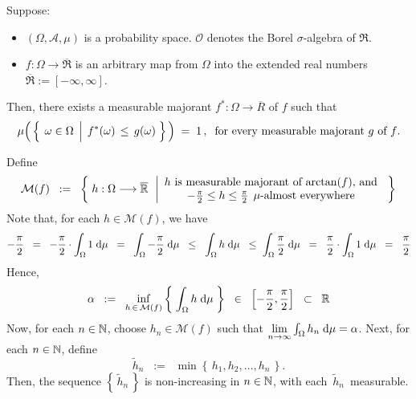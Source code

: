 \begin{theorem}
\mbox{}\vskip 0.1cm
\noindent
Suppose:
\begin{itemize}
\item
	$(\Omega,\mathcal{A},\mu)$ is a probability space.
	$\mathcal{O}$ denotes the Borel $\sigma$-algebra of $\Re$.
\item
	$f : \Omega \longrightarrow \overline{\Re}$
	is an arbitrary map from $\Omega$ into the extended real numbers
	$\overline{\Re} := [-\infty,\infty]$.
\end{itemize}
Then, there exists a measurable majorant $f^{*} : \Omega \longrightarrow \overline{R}$ of $f$ such that
\begin{equation*}
\mu\!\left(\,\left\{\;\left.\omega\overset{{\color{white}.}}{\in}\Omega\;\,\right\vert\; f^{*}(\omega) \,\leq\, g(\omega)\;\right\}\,\right)
\;=\;1\,,\;\;
\textnormal{for every measurable majorant $g$ of $f$}.
\end{equation*}
\end{theorem}
\proof
Define
\begin{equation*}
\mathcal{M}(f)
\;\; := \;\;
	\left\{\;
		h : \Omega \longrightarrow \overline{\Re}
	\;\,\left\vert
		\begin{array}{c}
		\textnormal{$h$ is measurable majorant of $\arctan(f)$, and}
		\\
		-\frac{\pi}{2} \leq h \leq \frac{\pi}{2} \;\, \mu\textnormal{-almost everywhere}
		\end{array}
	\right.
	\;\right\}
\end{equation*}
Note that, for each $h \in \mathcal{M}(f)$, we have
\begin{equation*}
-\dfrac{\pi}{2}
\;\;=\;\; -\dfrac{\pi}{2} \cdot \int_{\Omega} 1\;\d\mu
\;\;=\;\; \int_{\Omega} -\dfrac{\pi}{2} \;\d\mu
\;\;\leq\;\; \int_{\Omega} h \;\d\mu
\;\;\leq\; \int_{\Omega} \dfrac{\pi}{2} \;\d\mu
\;\;=\;\; \dfrac{\pi}{2} \cdot \int_{\Omega} 1\;\d\mu
\;\;=\;\; \dfrac{\pi}{2}
\end{equation*}
Hence,
\begin{equation*}
\alpha
\;\; := \;\; \underset{h\,\in\,\mathcal{M}(f)}{\inf}\left\{\;\int_{\Omega}h\;\d\mu\;\right\}
\;\;\in\;\; \left[-\dfrac{\pi}{2},\dfrac{\pi}{2}\right]
\;\;\subset\;\; \Re
\end{equation*}
Now, for each $n \in \N$, choose $h_{n} \in \mathcal{M}(f)$ such that
$\underset{n\rightarrow\infty}{\lim}\int_{\Omega}h_{n}\;\d\mu = \alpha$.
Next, for each $n \in \N$, define
\begin{equation*}
\widetilde{h}_{n} \;\; := \;\; \min\!\left\{\,h_{1},h_{2},\ldots,h_{n}\,\right\}.
\end{equation*}
Then, the sequence $\left\{\,\widetilde{h}_{n}\,\right\}$ is non-increasing in $n \in \N$,
with each \,$\widetilde{h}_{n}$\, measurable.

